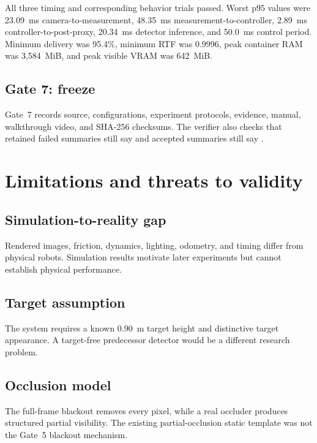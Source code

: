 \documentclass[11pt,oneside,openany]{book}
\newcommand{\file}[1]{\path{#1}}
\begin{document}
All three timing and corresponding behavior trials passed. Worst p95 values were 23.09~ms camera-to-measurement, 48.35~ms measurement-to-controller, 2.89~ms controller-to-post-proxy, 20.34~ms detector inference, and 50.0~ms control period. Minimum delivery was 95.4\%, minimum RTF was 0.9996, peak container RAM was 3,584~MiB, and peak visible VRAM was 642~MiB.

\section{Gate 7: freeze}

Gate~7 records source, configurations, experiment protocols, evidence, manual, walkthrough video, and SHA-256 checksums. The verifier also checks that retained failed summaries still say \file{fail} and accepted summaries still say \file{pass}.

\chapter{Limitations and threats to validity}

\section{Simulation-to-reality gap}

Rendered images, friction, dynamics, lighting, odometry, and timing differ from physical robots. Simulation results motivate later experiments but cannot establish physical performance.

\section{Target assumption}

The system requires a known 0.90~m target height and distinctive target appearance. A target-free predecessor detector would be a different research problem.

\section{Occlusion model}

The full-frame blackout removes every pixel, while a real occluder produces structured partial visibility. The existing partial-occlusion static template was not the Gate~5 blackout mechanism.
\end{document}
